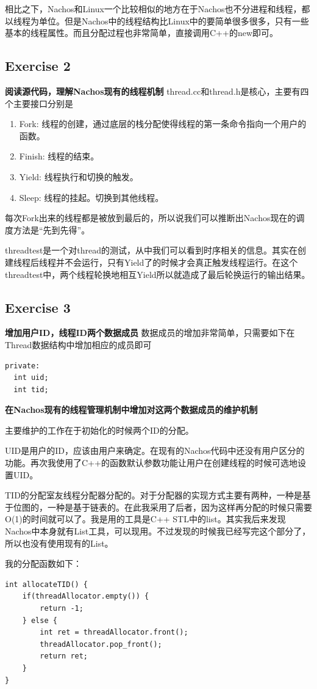 \documentclass{ctexart}
\begin{document}
相比之下，Nachos和Linux一个比较相似的地方在于Nachos也不分进程和线程，都以线程为单位。但是Nachos中的线程结构比Linux中的要简单很多很多，只有一些基本的线程属性。而且分配过程也非常简单，直接调用C++的new即可。
\subsection*{Exercise 2}
\textbf{阅读源代码，理解Nachos现有的线程机制}
thread.cc和thread.h是核心，主要有四个主要接口分别是
\begin{enumerate}
\item Fork: 线程的创建，通过底层的栈分配使得线程的第一条命令指向一个用户的函数。
\item Finish: 线程的结束。
\item Yield: 线程执行和切换的触发。
\item Sleep: 线程的挂起。切换到其他线程。
\end{enumerate}

每次Fork出来的线程都是被放到最后的，所以说我们可以推断出Nachos现在的调度方法是``先到先得''。

threadtest是一个对thread的测试，从中我们可以看到时序相关的信息。其实在创建线程后线程并不会运行，只有Yield了的时候才会真正触发线程运行。在这个threadtest中，两个线程轮换地相互Yield所以就造成了最后轮换运行的输出结果。

\subsection*{Exercise 3}
\textbf{增加用户ID，线程ID两个数据成员}
数据成员的增加非常简单，只需要如下在Thread数据结构中增加相应的成员即可
\begin{lstlisting}
private:
  int uid;
  int tid;
\end{lstlisting}

\textbf{在Nachos现有的线程管理机制中增加对这两个数据成员的维护机制}

主要维护的工作在于初始化的时候两个ID的分配。

UID是用户的ID，应该由用户来确定。在现有的Nachos代码中还没有用户区分的功能。再次我使用了C++的函数默认参数功能让用户在创建线程的时候可选地设置UID。

TID的分配室友线程分配器分配的。对于分配器的实现方式主要有两种，一种是基于位图的，一种是基于链表的。在此我采用了后者，因为这样再分配的时候只需要O(1)的时间就可以了。我是用的工具是C++ STL中的list。其实我后来发现Nachos中本身就有List工具，可以现用。不过发现的时候我已经写完这个部分了，所以也没有使用现有的List。

我的分配函数如下：
\begin{lstlisting}
int allocateTID() {
    if(threadAllocator.empty()) {
        return -1;
    } else {
        int ret = threadAllocator.front();
        threadAllocator.pop_front();
        return ret;
    }
}
\end{lstlisting}
\end{document}

